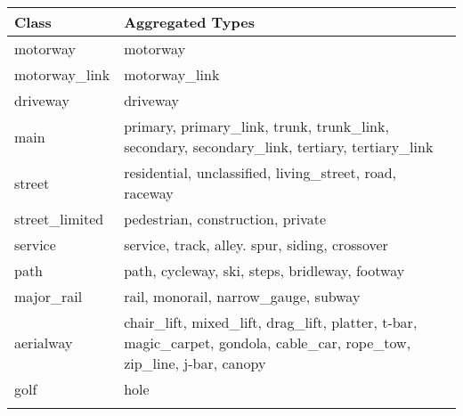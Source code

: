\begin{table}[H]
\label{my-label}
\begin{tabular}{p{3cm} | p{8cm}}
Class           & Aggregated Types                                                                                                              \\ \hline
motorway        & motorway                                                                                                                      \\
motorway\_link  & motorway\_link                                                                                                                \\
driveway        & driveway                                                                                                                      \\
main            & primary, primary\_link, trunk, trunk\_link, secondary, secondary\_link, tertiary, tertiary\_link                              \\
street          & residential, unclassified, living\_street, road, raceway                                                                      \\
street\_limited & pedestrian, construction, private                                                                                             \\
service         & service, track, alley. spur, siding, crossover                                                                                \\
path            & path, cycleway, ski, steps, bridleway, footway                                                                                \\
major\_rail     & rail, monorail, narrow\_gauge, subway                                                                                         \\
aerialway       & chair\_lift, mixed\_lift, drag\_lift, platter, t-bar, magic\_carpet, gondola, cable\_car, rope\_tow, zip\_line, j-bar, canopy \\
golf            & hole                                                                                                                          \\
                &                                                                                                                              
\end{tabular}
\end{table}

